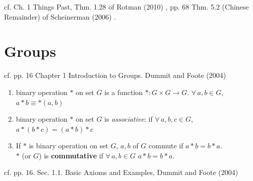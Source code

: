 cf. Ch. 1 Things Past, Thm. 1.28 of Rotman (2010) \cite{agat:JRotman2010}, pp. 68 Thm. 5.2 (Chinese Remainder) of Scheinerman (2006) \cite{agat:Sche2006}.  




\section{Groups}
cf. pp. 16 Chapter 1 Introduction to Groups. Dummit and Foote (2004) \cite{agat:DuFo2003}
\begin{definition}
	\begin{enumerate}
		\item binary operation $*$ on set $G$ is a function $*: G \times G \to G$.  $\forall \, a, b \in G$, $a* b \equiv *(a,b)$
		\item binary operation $*$ on set $G$ is \emph{associative}: if $\forall \, a, b, c \in G$, $a*(b*c) = (a*b) * c$ 
		\item If $*$ is binary operation on set $G$, $a,b $ of $G$ commute if $a*b = b*a$. \\
		$*$ (or $G$) is \textbf{commutative} if $\forall \, a, b \in G$ $a* b = b*a$.  
	\end{enumerate}
\end{definition}
cf. pp. 16. Sec. 1.1. Basic Axioms and Examples, Dummit and Foote (2004) \cite{agat:DuFo2003} 

